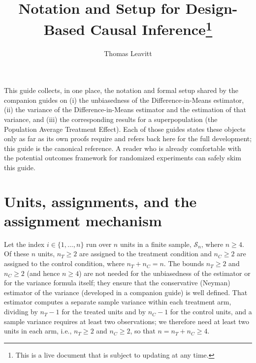 \documentclass[12pt,leqno]{article}
\theoremstyle{newstyle}
\begin{document}
\title{Notation and Setup for Design-Based Causal Inference\thanks{This is a live document that is subject to updating at any time.}}
\author{Thomas Leavitt}
\date{}
\maketitle

This guide collects, in one place, the notation and formal setup shared by the companion guides on (i) the unbiasedness of the Difference-in-Means estimator, (ii) the variance of the Difference-in-Means estimator and the estimation of that variance, and (iii) the corresponding results for a superpopulation (the Population Average Treatment Effect). Each of those guides states these objects only as far as its own proofs require and refers back here for the full development; this guide is the canonical reference. A reader who is already comfortable with the potential outcomes framework for randomized experiments can safely skim this guide.

\section{Units, assignments, and the assignment mechanism}

Let the index $i \in \{1, \ldots , n\}$ run over $n$ units in a finite sample, $\mathcal{S}_n$, where $n \geq 4$. Of these $n$ units, $n_T \geq 2$ are assigned to the treatment condition and $n_C \geq 2$ are assigned to the control condition, where $n_T + n_C = n$. The bounds $n_T \geq 2$ and $n_C \geq 2$ (and hence $n \geq 4$) are not needed for the unbiasedness of the estimator or for the variance formula itself; they ensure that the conservative (Neyman) estimator of the variance (developed in a companion guide) is well defined. That estimator computes a separate sample variance within each treatment arm, dividing by $n_T - 1$ for the treated units and by $n_C - 1$ for the control units, and a sample variance requires at least two observations; we therefore need at least two units in each arm, i.e., $n_T \geq 2$ and $n_C \geq 2$, so that $n = n_T + n_C \geq 4$.
\end{document}
